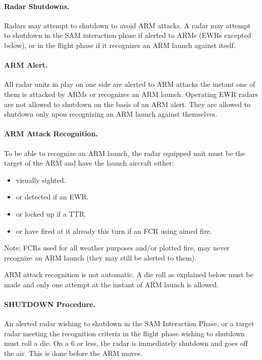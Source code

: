 \paragraph{Radar Shutdowns.} Radars may attempt to shutdown to avoid ARM attacks. A radar may attempt to shutdown in the SAM interaction phase if alerted to ARMs (EWRs excepted below), or in the flight phase if it recognizes an ARM launch against itself.

\paragraph{ARM Alert.} All radar units in play on one side are alerted to ARM attacks the instant one of them is attacked by ARMs or recognizes an ARM launch. Operating EWR radars are not allowed to shutdown on the basis of an ARM alert. They are allowed to shutdown only upon recognizing an ARM launch against themselves.

\paragraph{ARM Attack Recognition.} To be able to recognize an ARM launch, the radar equipped unit must be the target of the ARM and have the launch aircraft either:

\begin{itemize}
    \item visually sighted.

    \item or detected if an EWR.

    \item or locked up if a TTR.

    \item or have fired at it already this turn if an FCR using aimed fire.
\end{itemize}

Note: FCRs used for all weather purposes and/or plotted fire, may never recognize an ARM launch (they may still be alerted to them).

ARM attack recognition is not automatic. A die roll as explained below must be made and only one attempt at the instant of ARM launch is allowed.

\paragraph{SHUTDOWN Procedure.} An alerted radar wishing to shutdown in the SAM Interaction Phase, or a target radar meeting the recognition criteria in the flight phase wishing to shutdown must roll a die. On a 6 or less, the radar is immediately shutdown and goes off the air. This is done before the ARM moves. 

